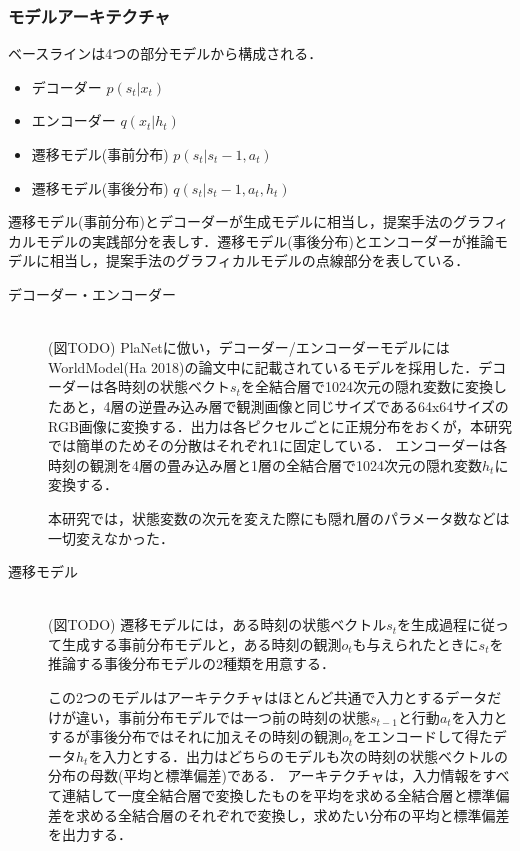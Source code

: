 \subsubsection{モデルアーキテクチャ}
ベースラインは4つの部分モデルから構成される．
\begin{itemize}
    \item デコーダー $p(s_t|x_t)$
    \item エンコーダー $q(x_t|h_t)$
    \item 遷移モデル(事前分布) $p(s_t|s_t-1, a_t)$
    \item 遷移モデル(事後分布) $q(s_t|s_t-1, a_t, h_t)$
\end{itemize}

遷移モデル(事前分布)とデコーダーが生成モデルに相当し，提案手法のグラフィカルモデルの実践部分を表しす．遷移モデル(事後分布)とエンコーダーが推論モデルに相当し，提案手法のグラフィカルモデルの点線部分を表している．

\begin{description}
    \item[デコーダー・エンコーダー]\mbox{}\\
(図TODO)
PlaNetに倣い，デコーダー/エンコーダーモデルにはWorldModel(Ha 2018)の論文中に記載されているモデルを採用した．デコーダーは各時刻の状態ベクト$s_t$を全結合層で1024次元の隠れ変数に変換したあと，4層の逆畳み込み層で観測画像と同じサイズである64x64サイズのRGB画像に変換する．出力は各ピクセルごとに正規分布をおくが，本研究では簡単のためその分散はそれぞれ1に固定している．
エンコーダーは各時刻の観測を4層の畳み込み層と1層の全結合層で1024次元の隠れ変数$h_t$に変換する．

本研究では，状態変数の次元を変えた際にも隠れ層のパラメータ数などは一切変えなかった．

    \item[遷移モデル]\mbox{}\\
(図TODO)
遷移モデルには，ある時刻の状態ベクトル$s_t$を生成過程に従って生成する事前分布モデルと，ある時刻の観測$o_t$も与えられたときに$s_t$を推論する事後分布モデルの2種類を用意する．

この2つのモデルはアーキテクチャはほとんど共通で入力とするデータだけが違い，事前分布モデルでは一つ前の時刻の状態$s_{t-1}$と行動$a_t$を入力とするが事後分布ではそれに加えその時刻の観測$o_t$をエンコードして得たデータ$h_t$を入力とする．出力はどちらのモデルも次の時刻の状態ベクトルの分布の母数(平均と標準偏差)である．
アーキテクチャは，入力情報をすべて連結して一度全結合層で変換したものを平均を求める全結合層と標準偏差を求める全結合層のそれぞれで変換し，求めたい分布の平均と標準偏差を出力する．

\end{description}

